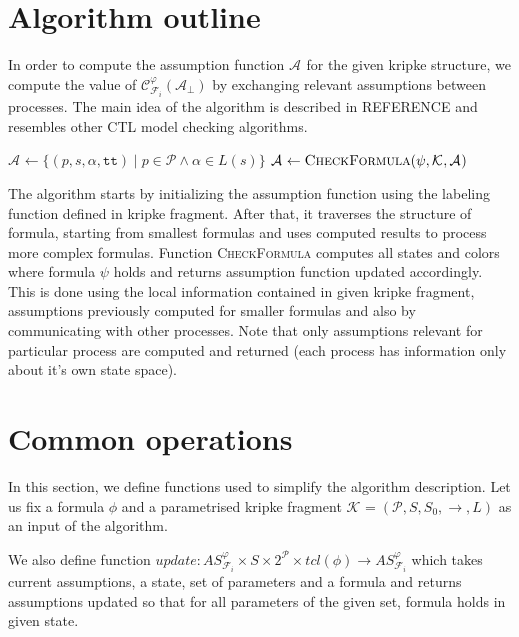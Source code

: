 \documentclass[12pt,oneside, draft]{fithesis2}
\newcommand{\as}[1][]{\ensuremath{\mathcal{A}_{#1}}}
\newcommand{\asemt}{\as[\perp]}
\newcommand{\ASphi}{\ensuremath{AS_{\kf{i}{}}^\varphi}}
\newcommand{\sem}{\ensuremath{\mathcal{C}_{\kf{i}{}}^\varphi}}
\newcommand{\method}[1]{\textnormal{\textsc{#1}}}
\newcommand{\true}{\ensuremath{\texttt{tt}}}
\newcommand{\ks}[1][]{\ensuremath{\mathcal{K}_{#1}}}
\newcommand{\kf}[2]{\ensuremath{\mathcal{F}^{#2}_{#1}}}
\newcommand{\fullKs}{\ensuremath{ \ks = (\params, S, S_0, \trans{}, L) }}
\newcommand{\trans}[1]{\stackrel{#1}{\rightarrow}}
\newcommand{\params}{\mathcal{P}}
\begin{document}
		\section{Algorithm outline}
		
			In order to compute the assumption function $\as$ for the given kripke structure, we compute the value of $\sem(\asemt)$ by exchanging relevant assumptions between processes.
			The main idea of the algorithm is described in REFERENCE and resembles other CTL model checking algorithms.
			
			\begin{algorithmic}[1]
				\Procedure{CheckCTL}{$ \phi, \fullKs $}
					\State $ \as \gets \{ (p, s, \alpha, \true) \mid  p \in \params \wedge \alpha \in L(s) \}$ 
							\State $ \as \gets \Call{CheckFormula}{\psi, \ks, \as } $
						\EndFor
					\EndFor
				\EndProcedure			
			\end{algorithmic} 
			
			The algorithm starts by initializing the assumption function using the labeling function defined in kripke fragment. After that, it traverses the structure of formula, starting from smallest formulas and uses computed results to process more complex formulas. Function \method{CheckFormula} computes all states and colors where formula $\psi$ holds and returns assumption function updated accordingly. This is done using the local information contained in given kripke fragment, assumptions previously computed for smaller formulas and also by communicating with other processes. Note that only assumptions relevant for particular process are computed and returned (each process has information only about it's own state space).
    	
    	\section{Common operations}
    		
    		In this section, we define functions used to simplify the algorithm description. Let us fix a formula $\phi$ and a parametrised kripke fragment $\fullKs$ as an input of the algorithm.						
			
			We also define function $update: \ASphi \times S \times 2^{\params} \times tcl(\phi) \rightarrow \ASphi $ which takes current assumptions, a state, set of parameters and a formula and returns assumptions updated so that for all parameters of the given set, formula holds in given state.
			
\end{document}
